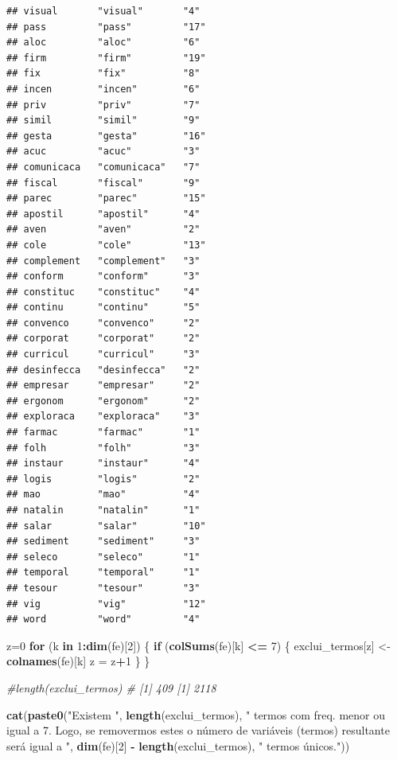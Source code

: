 \documentclass[]{article}
\newenvironment{Shaded}{\begin{snugshade}}{\end{snugshade}}
\newcommand{\CommentTok}[1]{\textcolor[rgb]{0.56,0.35,0.01}{\textit{#1}}}
\newcommand{\ControlFlowTok}[1]{\textcolor[rgb]{0.13,0.29,0.53}{\textbf{#1}}}
\newcommand{\DecValTok}[1]{\textcolor[rgb]{0.00,0.00,0.81}{#1}}
\newcommand{\KeywordTok}[1]{\textcolor[rgb]{0.13,0.29,0.53}{\textbf{#1}}}
\newcommand{\NormalTok}[1]{#1}
\newcommand{\OperatorTok}[1]{\textcolor[rgb]{0.81,0.36,0.00}{\textbf{#1}}}
\newcommand{\StringTok}[1]{\textcolor[rgb]{0.31,0.60,0.02}{#1}}
\begin{document}
\begin{verbatim}
## visual       "visual"       "4"        
## pass         "pass"         "17"       
## aloc         "aloc"         "6"        
## firm         "firm"         "19"       
## fix          "fix"          "8"        
## incen        "incen"        "6"        
## priv         "priv"         "7"        
## simil        "simil"        "9"        
## gesta        "gesta"        "16"       
## acuc         "acuc"         "3"        
## comunicaca   "comunicaca"   "7"        
## fiscal       "fiscal"       "9"        
## parec        "parec"        "15"       
## apostil      "apostil"      "4"        
## aven         "aven"         "2"        
## cole         "cole"         "13"       
## complement   "complement"   "3"        
## conform      "conform"      "3"        
## constituc    "constituc"    "4"        
## continu      "continu"      "5"        
## convenco     "convenco"     "2"        
## corporat     "corporat"     "2"        
## curricul     "curricul"     "3"        
## desinfecca   "desinfecca"   "2"        
## empresar     "empresar"     "2"        
## ergonom      "ergonom"      "2"        
## exploraca    "exploraca"    "3"        
## farmac       "farmac"       "1"        
## folh         "folh"         "3"        
## instaur      "instaur"      "4"        
## logis        "logis"        "2"        
## mao          "mao"          "4"        
## natalin      "natalin"      "1"        
## salar        "salar"        "10"       
## sediment     "sediment"     "3"        
## seleco       "seleco"       "1"        
## temporal     "temporal"     "1"        
## tesour       "tesour"       "3"        
## vig          "vig"          "12"       
## word         "word"         "4"
\end{verbatim}

\begin{Shaded}
\begin{Highlighting}[]
\NormalTok{    z=}\DecValTok{0}
    \ControlFlowTok{for}\NormalTok{ (k }\ControlFlowTok{in} \DecValTok{1}\OperatorTok{:}\KeywordTok{dim}\NormalTok{(fe)[}\DecValTok{2}\NormalTok{]) \{}
      \ControlFlowTok{if}\NormalTok{ (}\KeywordTok{colSums}\NormalTok{(fe)[k] }\OperatorTok{<=}\StringTok{ }\DecValTok{7}\NormalTok{) \{}
\NormalTok{        exclui_termos[z] <-}\StringTok{ }\KeywordTok{colnames}\NormalTok{(fe)[k]}
\NormalTok{        z =}\StringTok{ }\NormalTok{z}\OperatorTok{+}\DecValTok{1}
\NormalTok{      \}}
\NormalTok{    \}}
    
      \CommentTok{#length(exclui_termos) # [1] 409 [1] 2118}
    
    \KeywordTok{cat}\NormalTok{(}\KeywordTok{paste0}\NormalTok{(}\StringTok{"Existem "}\NormalTok{, }\KeywordTok{length}\NormalTok{(exclui_termos), }\StringTok{" termos com freq. menor ou igual a 7. Logo, se removermos estes o número de variáveis (termos) resultante será igual a "}\NormalTok{, }\KeywordTok{dim}\NormalTok{(fe)[}\DecValTok{2}\NormalTok{] }\OperatorTok{-}\StringTok{ }\KeywordTok{length}\NormalTok{(exclui_termos), }\StringTok{" termos únicos."}\NormalTok{))}
\end{Highlighting}
\end{Shaded}
\end{document}
